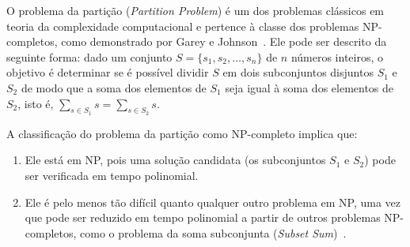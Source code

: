 \documentclass{article}
\begin{document}
O problema da partição (\textit{Partition Problem}) é um dos problemas clássicos em teoria da complexidade computacional e pertence à classe dos problemas NP-completos, como demonstrado por Garey e Johnson~\cite{garey1979computers}. Ele pode ser descrito da seguinte forma: dado um conjunto $S = \{s_1, s_2, \dots, s_n\}$ de $n$ números inteiros, o objetivo é determinar se é possível dividir $S$ em dois subconjuntos disjuntos $S_1$ e $S_2$ de modo que a soma dos elementos de $S_1$ seja igual à soma dos elementos de $S_2$, isto é, $\sum_{s \in S_1}s = \sum_{s \in S_2}s$.

A classificação do problema da partição como NP-completo implica que:
\begin{enumerate}
    \item Ele está em NP, pois uma solução candidata (os subconjuntos $S_1$ e $S_2$) pode ser verificada em tempo polinomial.
    \item Ele é pelo menos tão difícil quanto qualquer outro problema em NP, uma vez que pode ser reduzido em tempo polinomial a partir de outros problemas NP-completos, como o problema da soma subconjunta (\textit{Subset Sum})~\cite{karp1972reducibility}.
\end{enumerate}
\end{document}
